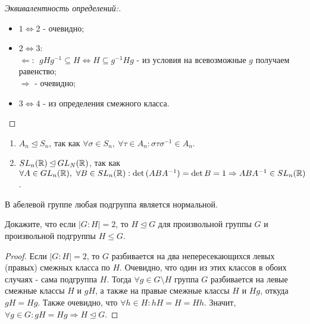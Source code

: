\begin{proof}[Эквивалентность определений:]\tab
    \begin{itemize}
        \item $1 \Longleftrightarrow 2$ - очевидно;
        \item $2 \Longleftrightarrow 3$:\\
        $\Longleftarrow: \ \ gHg^{-1} \subseteq H \Leftrightarrow H \subseteq g^{-1}Hg$ - из условия на всевозможные $g$ получаем равенство;\\
        $\Longrightarrow$ - очевидно;
        \item $3 \Longleftrightarrow 4$ - из определения смежного класса.
    \end{itemize}
\end{proof}
\begin{examples} \tab
    \begin{enumerate}
        \item $A_n \unlhd S_n$, так как $\forall \sigma\in S_n,\ \forall \tau\in A_n: \sigma\tau\sigma^{-1}\in A_n$.
        \item $SL_n(\mathbb{R})\unlhd GL_N(\mathbb{R})$, так как $\forall A\in GL_n(\mathbb{R}),\ \forall B\in SL_n(\mathbb{R}): \det{(ABA^{-1})}=\det{B}=1 \Rightarrow ABA^{-1}\in SL_n(\mathbb{R})$.
    \end{enumerate}
\end{examples}
\begin{subtheorem}
    В абелевой группе любая подгруппа является нормальной.
\end{subtheorem}
\begin{exercise}
    Докажите, что если $|G:H|=2$, то $H\unlhd G$ для произвольной группы $G$ и произвольной подгруппы $H\leq G$.
\end{exercise}
\begin{proof}
    Если $|G:H|=2$, то $G$ разбивается на два непересекающихся левых (правых) смежных класса по $H$. Очевидно, что один из этих классов  в обоих случаях - сама подгруппа $H$. Тогда $\forall g \in G \setminus H$ группа $G$ разбивается на левые смежные классы $H$ и $gH$, а также на правые смежные классы $H$ и $Hg$, откуда $gH = Hg$. Также очевидно, что $\forall h \in H: hH = H = Hh$. Значит, $\forall g \in G: gH = Hg \Longrightarrow H \unlhd G$.
\end{proof}

